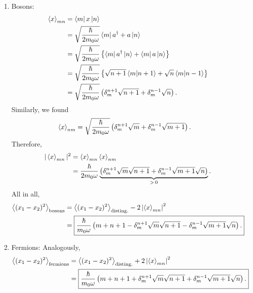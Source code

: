 \documentclass[11pt]{article}
\begin{document}
\begin{enumerate}[label=\textbf{\arabic*}.]
\begin{enumerate}
\begin{enumerate}[label=(\roman*)]
                \item Bosons:
                    \begin{align*}
                        \expval{x}_{mn} &= \bra{m}x\ket{n} \\
                        &= \sqrt{\frac{\hbar}{2m_0 \omega}} \bra{m} a^\dagger + a \ket{n} \\
                        &= \sqrt{\frac{\hbar}{2m_0 \omega}}\left\{ \bra{m}a^\dagger \ket{n} + \bra{m} a \ket{n} \right\} \\
                        &= \sqrt{\frac{\hbar}{2m_0 \omega}} \left\{\sqrt{n+1}\braket{m}{n+1} + \sqrt{n}\braket{m}{n-1}\right\} \\
                        &= \sqrt{\frac{\hbar}{2m_0 \omega}} \left( \delta_m^{n+1}\sqrt{n+1} + \delta_m^{n-1}\sqrt{n} \right) \text{.}
                    \end{align*}
                    Similarly, we found
                    \begin{align*}
                        \expval{x}_{nm} &= \sqrt{\frac{\hbar}{2m_0 \omega}} \left( \delta_m^{n+1}\sqrt{m} + \delta_m^{n-1}\sqrt{m+1} \right) \text{.}
                    \end{align*}
                    Therefore,
                    \begin{align*}
                        |\expval{x}_{mn}|^2 &= \expval{x}_{mn}\expval{x}_{nm} \\
                        &= \frac{\hbar}{2m_0 \omega}  \underbrace{\left(\delta_m^{n+1}\sqrt{m}\sqrt{n+1} + \delta_m^{n-1}\sqrt{m+1}\sqrt{n}\right)}_{>\, 0} \text{.}
                    \end{align*}
                    All in all,
                    \begin{align*}
                        \expval{(x_1 - x_2)^2}_\mathrm{bosons} &= \expval{(x_1 - x_2)^2}_\mathrm{disting.} - 2\left| \expval{x}_{mn} \right|^2 \\
                        &= \boxed{\frac{\hbar}{m_0\omega}\left(m+n+1 - \delta_m^{n+1}\sqrt{m}\sqrt{n+1} - \delta_m^{n-1}\sqrt{m+1}\sqrt{n} \right) \text{.}}
                    \end{align*}
                
                \item Fermions:
                    \newline
                    Analogously,
                    \begin{align*}
                        \expval{(x_1 - x_2)^2}_\mathrm{fermions} &= \expval{(x_1 - x_2)^2}_\mathrm{disting.} + 2\left| \expval{x}_{mn} \right|^2 \\
                        &= \boxed{\frac{\hbar}{m_0\omega}\left(m+n+1 + \delta_m^{n+1}\sqrt{m}\sqrt{n+1} + \delta_m^{n-1}\sqrt{m+1}\sqrt{n} \right) \text{.}}
                    \end{align*}
            \end{enumerate}


\end{enumerate}
\end{enumerate}
\end{document}
